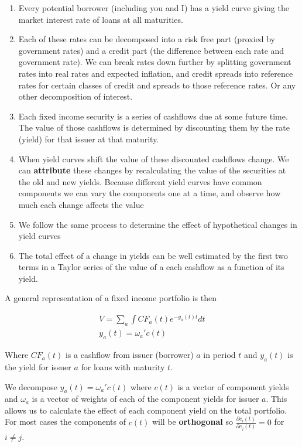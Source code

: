 \begin{enumerate}
\item  Every potential borrower (including you and I) has a yield curve giving the market interest rate of loans at all maturities. 
\item Each of these rates can be decomposed into a risk free part (proxied by government rates) and a credit part (the difference between each rate and government rate). We can break rates down further by splitting government rates into real rates and expected inflation, and credit spreads into reference rates for certain classes of credit and spreads to those reference rates. Or any other decomposition of interest.  
\item Each fixed income security is a series of cashflows due at some future time. The value of those cashflows is determined by discounting them by the rate (yield) for that issuer at that maturity.
\item When yield curves shift the value of these discounted cashflows change. We can \textbf{attribute} these changes by  recalculating the value of the securities at the old and new yields. Because different yield curves have common components we can vary the components one at a time, and observe how much each change affects the value 
\item We follow the same process to determine the effect of hypothetical changes in yield curves\\
\item The total effect of a change in yields can be well estimated by the first two terms in a Taylor series of the value of a each cashflow as a function of its yield.
\end{enumerate}

A general representation of a fixed income portfolio is then 

\begin{eqnarray*}
V = \sum_a \int CF_a(t)e^{-y_a(t)t}dt \\
y_a(t) = \omega_a' c(t)
\end{eqnarray*}

Where $CF_a(t)$ is a cashflow from issuer (borrower) $a$ in period $t$ and $y_a(t)$ is the yield for issuer $a$ for loans with maturity $t$. 

We decompose $y_a(t) = \omega_a' c(t)$ where $c(t)$ is a vector of component yields and $\omega_a$ is a vector of weights of each of the component yields for issuer $a$. This allows us to calculate the effect of each component yield on the total portfolio. For most cases the components of $c(t)$ will be \textbf{orthogonal} so $\frac{\partial c_i(t)}{\partial c_j(t)} = 0$ for $i \neq j$.  


